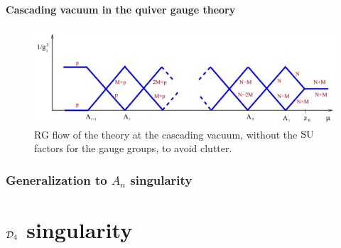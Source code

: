     \subsection{Cascading vacuum in the quiver gauge theory}



    \begin{figure}[H]
        \centering
        \includegraphics[scale=0.3]{Pictures/RGflowcascade.png}
        \caption{RG flow of the theory at the cascading vacuum, without the $\text{SU}$ factors for the gauge groups, to avoid clutter.}
    \end{figure}



\section{Generalization to $A_n$ singularity}

\part{$\mathcal{D}_4$ singularity}
